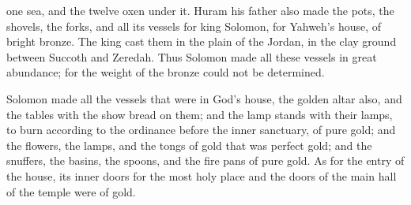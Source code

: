 {one sea, and the twelve oxen under it.
Huram his father also made the pots, the shovels, the forks, and all its vessels for king Solomon, for Yahweh’s house, of bright bronze.
The king cast them in the plain of the Jordan, in the clay ground between Succoth and Zeredah.
Thus Solomon made all these vessels in great abundance; for the weight of the bronze could not be determined.
\par }{\PP {}Solomon made all the vessels that were in God’s house, the golden altar also, and the tables with the show bread on them;
and the lamp stands with their lamps, to burn according to the ordinance before the inner sanctuary, of pure gold;
and the flowers, the lamps, and the tongs of gold that was perfect gold;
and the snuffers, the basins, the spoons, and the fire pans of pure gold. As for the entry of the house, its inner doors for the most holy place and the doors of the main hall of the temple were of gold.

}
